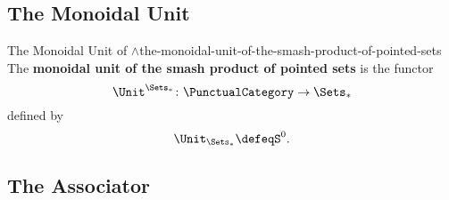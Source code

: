 \subsection{The Monoidal Unit}\label{subsection-the-monoidal-unit-of-the-smash-product-of-pointed-sets}
\begin{definition}{The Monoidal Unit of $\wedge$}{the-monoidal-unit-of-the-smash-product-of-pointed-sets}%
    The \textbf{monoidal unit of the smash product of pointed sets} is the functor
    \[
        \Unit^{\Sets_{*}}
        \colon
        \PunctualCategory
        \to
        \Sets_{*}
    \]
    defined by
    \[
        \Unit_{\Sets_{*}}%
        \defeq%
        S^{0}.
    \]%
\end{definition}
\subsection{The Associator}\label{subsection-the-smash-product-of-pointed-sets-the-associator}
